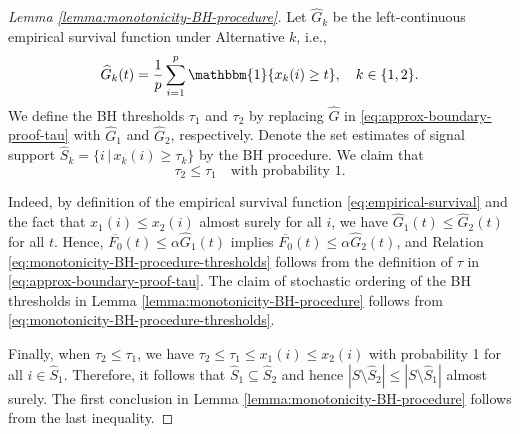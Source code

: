 \begin{proof}[Lemma \ref{lemma:monotonicity-BH-procedure}]
Let $\widehat{G}_k$ be the left-continuous empirical survival function under Alternative $k$, i.e.,
\begin{equation} \label{eq:empirical-survival}
    \widehat{G}_k(t) = \frac{1}{p}\sum_{i=1}^p\mathbbm{1}\{x_k(i) \ge t\}, \quad k\in\{1,2\}.
\end{equation}
We define the BH thresholds $\tau_1$ and $\tau_2$ by replacing $\widehat{G}$ in \eqref{eq:approx-boundary-proof-tau} with $\widehat{G}_1$ and $\widehat{G}_2$, respectively.
Denote the set estimates of signal support $\widehat{S}_k = \{i\,|\,x_k(i)\ge\tau_k\}$ by the BH procedure.
We claim that 
\begin{equation} \label{eq:monotonicity-BH-procedure-thresholds}
    \tau_2 \le \tau_1 \quad \text{with probability } 1.
\end{equation}

Indeed, by definition of the empirical survival function \eqref{eq:empirical-survival} and the fact that $x_1(i) \le x_2(i)$ almost surely for all $i$,  we have $\widehat{G}_1(t) \le \widehat{G}_2(t)$ for all $t$.
Hence, $\overline{F_0}(t)\le\alpha\widehat{G}_1(t)$ implies $\overline{F_0}(t)\le\alpha\widehat{G}_2(t)$, and Relation \eqref{eq:monotonicity-BH-procedure-thresholds} follows from the definition of $\tau$ in \eqref{eq:approx-boundary-proof-tau}.
The claim of stochastic ordering of the \ac{BH} thresholds in Lemma \ref{lemma:monotonicity-BH-procedure} follows from \eqref{eq:monotonicity-BH-procedure-thresholds}.

Finally, when $\tau_2 \le \tau_1$, we have $\tau_2 \le \tau_1 \le x_1(i) \le x_2(i)$ with probability 1 for all $i\in\widehat{S}_1$.
Therefore, it follows that $\widehat{S}_1 \subseteq \widehat{S}_2$ and hence $|S\setminus\widehat{S}_2| \le |S\setminus\widehat{S}_1|$ almost surely. 
The first conclusion in Lemma \ref{lemma:monotonicity-BH-procedure} follows from the last inequality.
\end{proof}

